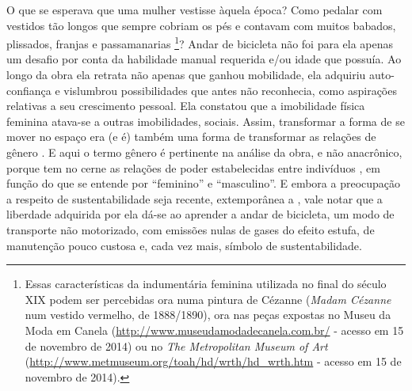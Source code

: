 O que se esperava que uma mulher vestisse àquela época? Como pedalar com vestidos tão longos que sempre cobriam os pés e contavam com muitos babados, plissados, franjas e passamanarias%
\footnote{Essas características da indumentária feminina utilizada no final do século XIX podem ser percebidas ora numa pintura de Cézanne (\emph{Madam Cézanne} num vestido vermelho, de 1888/1890), ora nas peças expostas no Museu da Moda em Canela (\url{http://www.museudamodadecanela.com.br/} - acesso em 15 de novembro de 2014) ou no \emph{The Metropolitan Museum of Art} (\url{http://www.metmuseum.org/toah/hd/wrth/hd_wrth.htm} - acesso em 15 de novembro de 2014).}?
Andar de bicicleta não foi para ela apenas um desafio por conta da habilidade manual requerida e/ou idade que possuía. Ao longo da obra ela retrata não apenas que ganhou mobilidade, ela adquiriu auto-confiança e vislumbrou possibilidades que antes não reconhecia, como aspirações relativas a seu crescimento pessoal. Ela constatou que a imobilidade física feminina atava-se a outras imobilidades, sociais. Assim, transformar a forma de se mover no espaço era (e é) também uma forma de transformar as relações de gênero \cite{HANSON2010}. E aqui o termo gênero é pertinente na análise da obra, e não anacrônico, porque tem no cerne as relações de poder estabelecidas entre indivíduos
\cite{SCOTT1986}, em função do que se entende por ``feminino'' e ``masculino''.
E embora a preocupação a respeito de sustentabilidade seja recente, extemporânea a , vale notar que a liberdade adquirida por ela dá-se ao aprender a andar de bicicleta, um modo de transporte não motorizado, com emissões nulas de gases do efeito estufa, de manutenção pouco custosa e, cada vez mais, símbolo de sustentabilidade.

